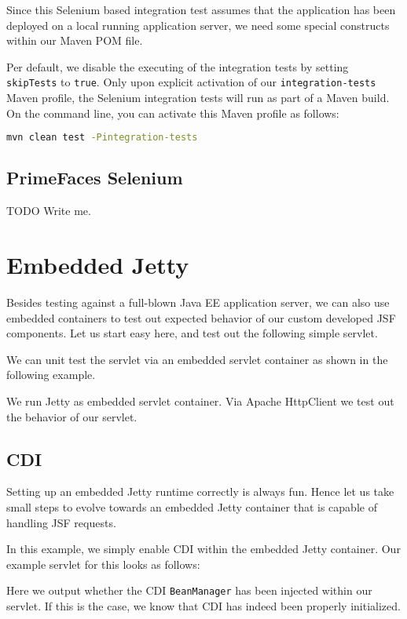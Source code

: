 Since this Selenium based integration test assumes that the application has been deployed on a local running application server, we need some special constructs within our Maven POM file.

Per default, we disable the executing of the integration tests by setting \texttt{skipTests} to \texttt{true}.
Only upon explicit activation of our \texttt{integration-tests} Maven profile,
the Selenium integration tests will run as part of a Maven build.
On the command line, you can activate this Maven profile as follows:
\begin{lstlisting}[language=bash]
	mvn clean test -Pintegration-tests
\end{lstlisting}

\subsection{PrimeFaces Selenium}
\begin{TODO}{TODO}
	Write me.
\end{TODO}

\section{Embedded Jetty}
Besides testing against a full-blown Java EE application server, we can also use embedded containers to test out expected behavior of our custom developed JSF components.
Let us start easy here, and test out the following simple servlet.


We can unit test the servlet via an embedded servlet container as shown in the following example.

We run Jetty \cite{jetty} as embedded servlet container.
Via Apache HttpClient \cite{httpclient} we test out the behavior of our servlet.

\subsection{CDI}
Setting up an embedded Jetty runtime correctly is always fun.
Hence let us take small steps to evolve towards an embedded Jetty container that is capable of handling JSF requests.

In this example, we simply enable CDI within the embedded Jetty container.
Our example servlet for this looks as follows:

Here we output whether the CDI \texttt{BeanManager} has been injected within our servlet.
If this is the case, we know that CDI has indeed been properly initialized.

